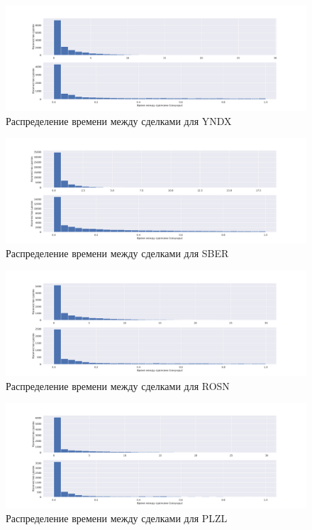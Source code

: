 \begin{figure}
        \includegraphics[scale=0.35]{fig/timedistr/SE/YNDX.pdf}
        \caption{Распределение времени между сделками для YNDX}
        \label{appstart}
\end{figure}
\begin{figure}
        \includegraphics[scale=0.35]{fig/timedistr/SE/SBER.pdf}
        \caption{Распределение времени между сделками для SBER}
        \label{app}
\end{figure}
\begin{figure}
    \includegraphics[scale=0.35]{fig/timedistr/SE/ROSN.pdf}
    \caption{Распределение времени между сделками для ROSN}
    \label{app}
\end{figure}
\begin{figure}
        \includegraphics[scale=0.35]{fig/timedistr/SE/PLZL.pdf}
        \caption{Распределение времени между сделками для PLZL}
        \label{app}
\end{figure}
